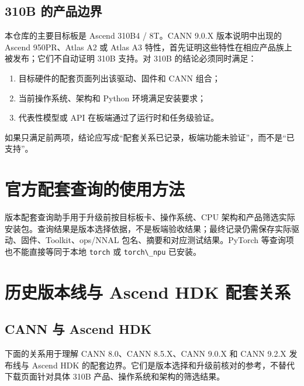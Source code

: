 \subsection{310B 的产品边界}\label{b-ux7684ux4ea7ux54c1ux8fb9ux754c}

本仓库的主要目标板是 Ascend 310B4 / 8T。CANN 9.0.X 版本说明中出现的
Ascend 950PR、Atlas A2 或 Atlas A3
特性，首先证明这些特性在相应产品族上被发布；它们不自动证明 310B 支持。对
310B 的结论必须同时满足：

\begin{enumerate}
\def\labelenumi{\arabic{enumi}.}
\tightlist
\item
  目标硬件的配套页面列出该驱动、固件和 CANN 组合；
\item
  当前操作系统、架构和 Python 环境满足安装要求；
\item
  代表性模型或 API 在板端通过了运行时和任务级验证。
\end{enumerate}

如果只满足前两项，结论应写成``配套关系已记录，板端功能未验证''，而不是``已支持''。

\section{官方配套查询的使用方法}\label{ux5b98ux65b9ux914dux5957ux67e5ux8be2ux7684ux4f7fux7528ux65b9ux6cd5}

版本配套查询助手用于升级前按目标板卡、操作系统、CPU
架构和产品筛选实际安装包。查询结果是版本选择依据，不是板端验收结果；最终记录仍需保存实际驱动、固件、Toolkit、ops/NNAL
包名、摘要和对应测试结果。PyTorch 等查询项也不能直接等同于本地
\passthrough{\lstinline!torch!} 或 \passthrough{\lstinline!torch\_npu!}
已安装。

\section{历史版本线与 Ascend HDK
配套关系}\label{ux5386ux53f2ux7248ux672cux7ebfux4e0e-ascend-hdk-ux914dux5957ux5173ux7cfb}

\subsection{CANN 与 Ascend HDK}\label{cann-ux4e0e-ascend-hdk}

下面的关系用于理解 CANN 8.0、CANN 8.5.X、CANN 9.0.X 和 CANN 9.2.X
发布线与 Ascend HDK
的配套边界。它们是版本选择和升级前核对的参考，不替代下载页面针对具体
310B 产品、操作系统和架构的筛选结果。

